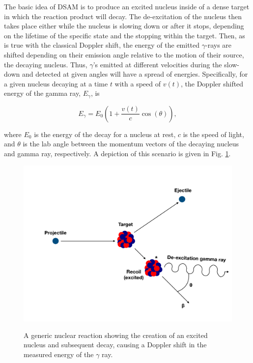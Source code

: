 The basic idea of DSAM is to produce an excited nucleus inside of a dense target in which the reaction product will decay. The de-excitation of the nucleus then takes place either while the nucleus is slowing down or after it stops, depending on the lifetime of the specific state and the stopping within the target. Then, as is true with the classical Doppler shift, the energy of the emitted $\gamma$-rays are shifted depending on their emission angle relative to the motion of their source, the decaying nucleus. Thus, $\gamma$'s emitted at different velocities during the slow-down and detected at given angles will have a spread of energies. Specifically, for a given nucleus decaying at a time $t$ with a speed of $v(t)$, the Doppler shifted energy of the gamma ray, $E_{\gamma}$, is 

\begin{equation}
E_{\gamma} = E_{0} \left(1 + \dfrac{v(t)}{c} \cos (\theta)   \right),
\label{eqn: doppler1}
\end{equation}

\noindent where $E_{0}$ is the energy of the decay for a nucleus at rest, $c$ is the speed of light, and $\theta$ is the lab angle between the momentum vectors of the decaying nucleus and gamma ray, respectively. A depiction of this scenario is given in Fig. \ref{fig: decay}.

\begin{figure}
\includegraphics[width=\linewidth]{figures/decay.pdf}
\label{fig: decay}
\caption{A generic nuclear reaction showing the creation of an excited nucleus and subsequent decay, causing a Doppler shift in the measured energy of the $\gamma$ ray.}
\end{figure}


